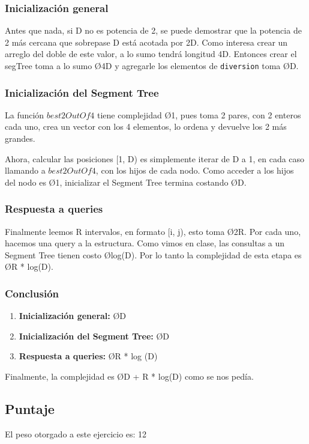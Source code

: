 \subsubsection{Inicialización general}
Antes que nada, si D no es potencia de 2, se puede demostrar que la potencia de 2 m\'as cercana que sobrepase D est\'a acotada por 2D. Como interesa crear un arreglo del doble de este valor, a lo sumo tendr\'a longitud 4D. Entonces crear el segTree toma a lo sumo \O{4D} y agregarle los elementos de \texttt{diversion} toma \O{D}.

\subsubsection{Inicialización del Segment Tree}
La funci\'on $best2OutOf4$ tiene complejidad \O{1}, pues toma 2 pares, con 2 enteros cada uno, crea un vector con los 4 elementos, lo ordena y devuelve los 2 m\'as grandes.

Ahora, calcular las posiciones [1, D) es simplemente iterar de D a 1, en cada caso llamando a $best2OutOf4$, con los hijos de cada nodo. Como acceder a los hijos del nodo es \O{1}, inicializar el Segment Tree termina costando \O{D}.

\subsubsection{Respuesta a queries}
Finalmente leemos R intervalos, en formato [i, j), esto toma \O{2R}. Por cada uno, hacemos una query a la estructura. Como vimos en clase, las consultas a un Segment Tree tienen costo \O{log(D)}. Por lo tanto la complejidad de esta etapa es \O{R * log(D)}.

\subsubsection{Conclusión}
\begin{enumerate}
\item \textbf{Inicialización general:} \O{D}
\item \textbf{Inicialización del Segment Tree:} \O{D}
\item \textbf{Respuesta a queries:} \O{R * log (D)}
\end{enumerate}

Finalmente, la complejidad es \O{D + R * log(D)} como se nos ped\'ia.

\subsection{Puntaje}
El peso otorgado a este ejercicio es: 12
